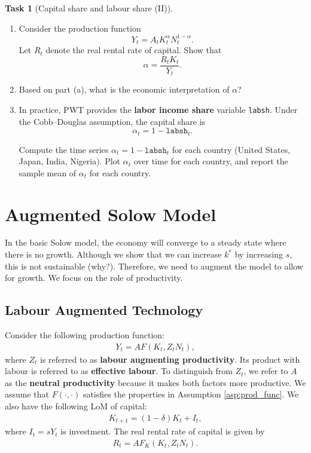 \documentclass{book}
\theoremstyle{definition}
\newtheorem{task}{Task}[chapter]
\theoremstyle{plain}
\begin{document}
\begin{task}[Capital share and labour share (II)]
\begin{enumerate}[label=\arabic*.]
        \begin{enumerate}[label=\alph*.]
            \item Consider the production function
            \[
            Y_t = A_t K_t^{\alpha} N_t^{1-\alpha}.
            \]
            Let $R_t$ denote the real rental rate of capital. Show that
            \[
            \alpha = \frac{R_t K_t}{Y_t}.
            \]
            
            \item Based on part (a), what is the economic interpretation of $\alpha$?
            
            \item In practice, PWT provides the \textbf{labor income share} variable \texttt{labsh}. Under the Cobb--Douglas assumption, the capital share is
            \[
            \alpha_t = 1 - \texttt{labsh}_t.
            \]
            
            Compute the time series $\alpha_t = 1 - \texttt{labsh}_t$ for each country (United States, Japan, India, Nigeria). Plot $\alpha_t$ over time for each country, and report the sample mean of $\alpha_t$ for each country.
        \end{enumerate}
    \end{enumerate}
\end{task}

\medskip

\section{Augmented Solow Model}
In the basic Solow model, the economy will converge to a steady state where there is no growth. Although we show that we can increase $k^*$ by increasing $s$, this is not sustainable (why?). Therefore, we need to augment the model to allow for growth. We focus on the role of productivity.

\subsection{Labour Augmented Technology}
Consider the following production function:
\begin{align*}
    Y_t = A F(K_t, Z_t N_t),
\end{align*}
where $Z_t$ is referred to as \textbf{labour augmenting productivity}.  Its product with labour is referred to as \textbf{effective labour}. To distinguish from $Z_t$, we refer to $A$ as the \textbf{neutral productivity} because it makes both factors more productive. We assume that $F(\cdot, \cdot)$ satisfies the properties in Assumption \ref{asp:prod_func}. We also have the following LoM of capital:
\begin{align*}
    K_{t+1} = (1-\delta) K_t + I_t,
\end{align*}
where $I_t = s Y_t$ is investment. The real rental rate of capital is given by
\begin{align*}
    R_t = A F_K(K_t, Z_t N_t).
\end{align*}
\end{document}
